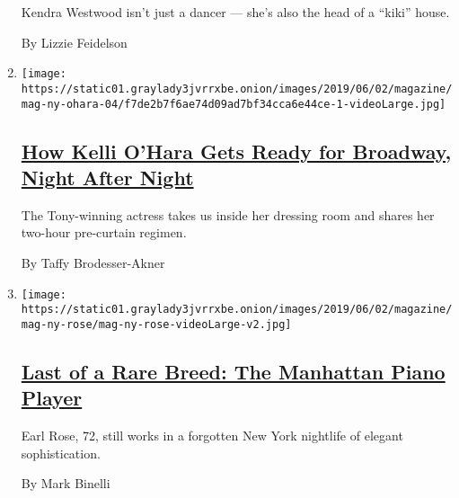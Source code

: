 \begin{enumerate}
  Kendra Westwood isn't just a dancer --- she's also the head of a
  ``kiki'' house.

  By Lizzie Feidelson
\item
  \texttt{[image: https://static01.graylady3jvrrxbe.onion/images/2019/06/02/magazine/mag-ny-ohara-04/f7de2b7f6ae74d09ad7bf34cca6e44ce-1-videoLarge.jpg]}

  \hypertarget{how-kelli-ohara-gets-ready-for-broadway-night-after-night}{%
  \subsection{\texorpdfstring{\href{/interactive/2019/05/30/magazine/broadway-kiss-me-kate.html}{How
  Kelli O'Hara Gets Ready for Broadway, Night After
  Night}}{How Kelli O'Hara Gets Ready for Broadway, Night After Night}}\label{how-kelli-ohara-gets-ready-for-broadway-night-after-night}}

  The Tony-winning actress takes us inside her dressing room and shares
  her two-hour pre-curtain regimen.

  By Taffy Brodesser-Akner
\item
  \texttt{[image: https://static01.graylady3jvrrxbe.onion/images/2019/06/02/magazine/mag-ny-rose/mag-ny-rose-videoLarge-v2.jpg]}

  \hypertarget{last-of-a-rare-breed-the-manhattan-piano-player}{%
  \subsection{\texorpdfstring{\href{/interactive/2019/05/30/magazine/earl-rose-piano-carlyle-new-york.html}{Last
  of a Rare Breed: The Manhattan Piano
  Player}}{Last of a Rare Breed: The Manhattan Piano Player}}\label{last-of-a-rare-breed-the-manhattan-piano-player}}

  Earl Rose, 72, still works in a forgotten New York nightlife of
  elegant sophistication.

  By Mark Binelli
\end{enumerate}

